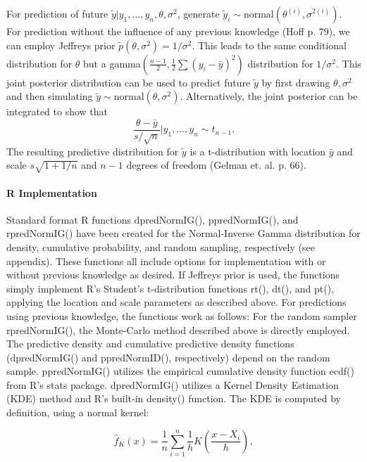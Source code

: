 \documentclass[12pt, a4paper]{article}
\begin{document}
        For prediction of future $\tilde{y}|y_1,...,y_n,\theta,\sigma^2$, generate $\tilde{y}_i \sim \text{normal}\left(\theta^{(i)},\sigma^{2(i)}\right)$.\\

        For prediction without the influence of any previous knowledge (Hoff p. 79), we can employ Jeffreys prior $\tilde{p}\left(\theta,\sigma^2\right) = 1/\sigma^2$.  This leads to the same conditional distribution for $\theta$ but a gamma$\left(\frac{n-1}{2},\frac{1}{2}\sum\left(y_i - \bar{y}\right)^2\right)$ distribution for $1/\sigma^2$.  This joint posterior distribution can be used to predict future $\tilde{y}$ by first drawing $\theta,\sigma^2$ and then simulating $\tilde{y}\sim\text{normal}\left(\theta,\sigma^2\right)$.   Alternatively, the joint posterior can be integrated to show that
        $$\dfrac{\theta-\bar{y}}{s/\sqrt{n}}|y_1,...,y_n\sim t_{n-1}.$$
        The resulting predictive distribution for $\tilde{y}$ is a t-distribution with location $\bar{y}$ and scale $s\sqrt{1+1/n}$ and $n-1$ degrees of freedom (Gelman et. al. p. 66).


      \paragraph{R Implementation}
      Standard format R functions dpredNormIG(), ppredNormIG(), and rpredNormIG() have been created for the Normal-Inverse Gamma distribution for density, cumulative probability, and random sampling, respectively (see appendix).  These functions all include options for implementation with or without previous knowledge as desired.  If Jeffreys prior is used, the functions simply implement R's Student's t-distribution functions rt(), dt(), and pt(), applying the location and scale parameters as described above.  For predictions using previous knowledge, the functions work as follows:  For the random sampler rpredNormIG(), the Monte-Carlo method described above is directly employed.  The predictive density and cumulative predictive density functions (dpredNormIG() and ppredNormID(), respectively) depend on the random sample.  ppredNormIG() utilizes the empirical cumulative density function ecdf() from R's stats package.  dpredNormIG() utilizes a Kernel Density Estimation (KDE) method and R's built-in density() function.  The KDE is computed by definition, using a normal kernel:

      $$\hat{f}_K(x) = \frac{1}{n}\sum_{i=1}^n\frac{1}{h}K\left(\frac{x-X_i}{h}\right),$$
\end{document}
